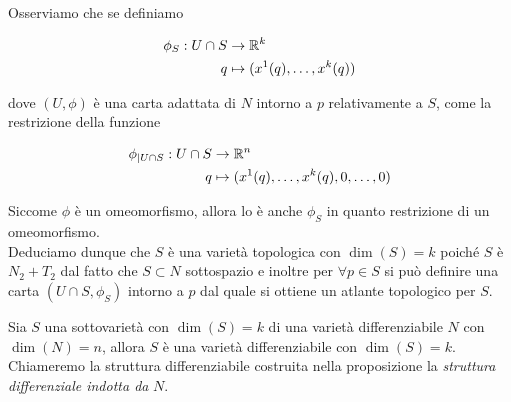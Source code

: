 Osserviamo che se definiamo

\begin{align}
	\begin{split}
		\phi_{S} : U \cap S &\to \mathbb{R}^{k}\\
		q &\mapsto (x^{1}(q),\dots,x^{k}(q))
	\end{split}
\end{align}

dove $ (U,\phi) $ è una carta adattata di $ N $ intorno a $ p $ relativamente a $ S $, come la restrizione della funzione

\begin{align}
	\begin{split}
		\phi_{| U \cap S} : U \cap S &\to \mathbb{R}^{n}\\
		q &\mapsto (x^{1}(q),\dots,x^{k}(q),0,\dots,0)
	\end{split}
\end{align}

Siccome $ \phi $ è un omeomorfismo, allora lo è anche $ \phi_{S} $ in quanto restrizione di un omeomorfismo.\\
Deduciamo dunque che $ S $ è una varietà topologica con $ \dim(S)=k $ poiché $ S $ è $ N_{2}+T_{2} $ dal fatto che $ S \subset N $ sottospazio e inoltre per $ \forall p \in S $ si può definire una carta $ (U \cap S,\phi_{S}) $ intorno a $ p $ dal quale si ottiene un atlante topologico per $ S $.

\begin{definition}
	Sia $ S $ una sottovarietà con $ \dim(S)=k $ di una varietà differenziabile $ N $ con $ \dim(N)=n $, allora $ S $ è una varietà differenziabile con $ \dim(S)=k $.\\
	Chiameremo la struttura differenziabile costruita nella proposizione la \textit{struttura differenziale indotta da} $ N $.
\end{definition}

